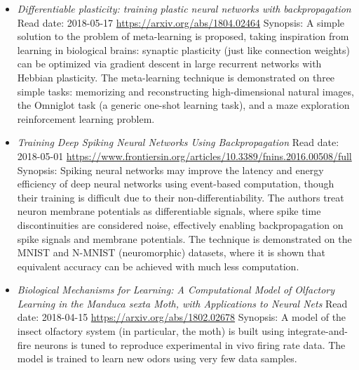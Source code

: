 \documentclass{article}%
\begin{document}
\begin{itemize}
\item%
\textit{Differentiable plasticity: training plastic neural networks with backpropagation}%
\newline%
Read date: 2018{-}05{-}17%
\newline%
\href{https://arxiv.org/abs/1804.02464}{https://arxiv.org/abs/1804.02464}%
\newline%
Synopsis: A simple solution to the problem of meta{-}learning is proposed, taking inspiration from learning in biological brains: synaptic plasticity (just like connection weights) can be optimized via gradient descent in large recurrent networks with Hebbian plasticity. The meta{-}learning technique is demonstrated on three simple tasks: memorizing and reconstructing high{-}dimensional natural images, the Omniglot task (a generic one{-}shot learning task), and a maze exploration reinforcement learning problem.%
\item%
\textit{Training Deep Spiking Neural Networks Using Backpropagation}%
\newline%
Read date: 2018{-}05{-}01%
\newline%
\href{https://www.frontiersin.org/articles/10.3389/fnins.2016.00508/full}{https://www.frontiersin.org/articles/10.3389/fnins.2016.00508/full}%
\newline%
Synopsis: Spiking neural networks may improve the latency and energy efficiency of deep neural networks using event{-}based computation, though their training is difficult due to their non{-}differentiability. The authors treat neuron membrane potentials as differentiable signals, where spike time discontinuities are considered noise, effectively enabling backpropagation on spike signals and membrane potentials.  The technique is demonstrated on the MNIST and N{-}MNIST (neuromorphic) datasets, where it is shown that equivalent accuracy can be achieved with much less computation.%
\item%
\textit{Biological Mechanisms for Learning: A Computational Model of Olfactory Learning in the Manduca sexta Moth, with Applications to Neural Nets}%
\newline%
Read date: 2018{-}04{-}15%
\newline%
\href{https://arxiv.org/abs/1802.02678}{https://arxiv.org/abs/1802.02678}%
\newline%
Synopsis: A model of the insect olfactory system (in particular, the moth) is built using integrate{-}and{-}fire neurons is tuned to reproduce experimental in vivo firing rate data. The model is trained to learn new odors using very few data samples.%

\end{itemize}
\end{document}
